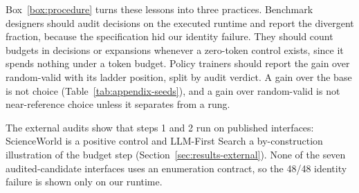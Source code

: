 Box~\ref{box:procedure} turns these lessons into three practices. Benchmark designers should audit decisions on the executed runtime and report the divergent fraction, because the specification hid our identity failure. They should count budgets in decisions or expansions whenever a zero-token control exists, since it spends nothing under a token budget. Policy trainers should report the gain over random-valid with its ladder position, split by audit verdict. A gain over the base is not choice (Table~\ref{tab:appendix-seeds}), and a gain over random-valid is not near-reference choice unless it separates from a rung.

The external audits show that steps 1 and 2 run on published interfaces: ScienceWorld \citep{wang2022scienceworld} is a positive control and LLM-First Search a by-construction illustration of the budget step (Section~\ref{sec:results-external}). None of the seven audited-candidate interfaces uses an enumeration contract, so the 48/48 identity failure is shown only on our runtime.

